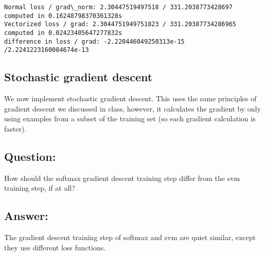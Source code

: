 \documentclass[11pt]{article}
\begin{document}
    \begin{Verbatim}[commandchars=\\\{\}]
Normal loss / grad\_norm: 2.30447519497518 / 331.2038773428697 computed in 0.16248798370361328s
Vectorized loss / grad: 2.3044751949751823 / 331.20387734286965 computed in 0.02423405647277832s
difference in loss / grad: -2.220446049250313e-15 /2.2241223160084674e-13 

    \end{Verbatim}

    \hypertarget{stochastic-gradient-descent}{%
\subsection{Stochastic gradient
descent}\label{stochastic-gradient-descent}}

We now implement stochastic gradient descent. This uses the same
principles of gradient descent we discussed in class, however, it
calculates the gradient by only using examples from a subset of the
training set (so each gradient calculation is faster).

    \hypertarget{question}{%
\subsection{Question:}\label{question}}

How should the softmax gradient descent training step differ from the
svm training step, if at all?

    \hypertarget{answer}{%
\subsection{Answer:}\label{answer}}

The gradient descent training step of softmax and svm are quiet similar,
except they use different loss functions.
\end{document}
